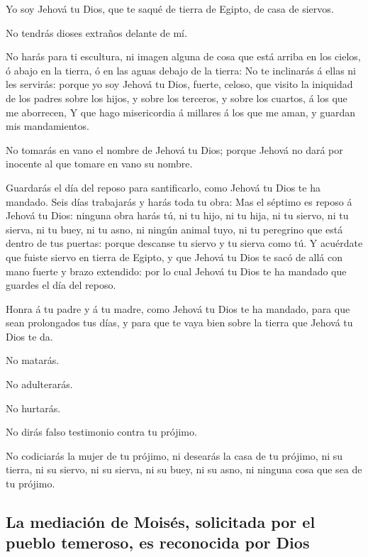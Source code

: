  Yo soy Jehová tu Dios, que te saqué de tierra de Egipto,
de casa de siervos.

 No tendrás dioses extraños delante de mí.

 No harás para ti escultura, ni imagen alguna de cosa que
está arriba en los cielos, ó abajo en la tierra, ó en las aguas debajo
de la tierra:  No te inclinarás á ellas ni les servirás:
porque yo soy Jehová tu Dios, fuerte, celoso, que visito la iniquidad de
los padres sobre los hijos, y sobre los terceros, y sobre los cuartos, á
los que me aborrecen,  Y que hago misericordia á millares
á los que me aman, y guardan mis mandamientos.

 No tomarás en vano el nombre de Jehová tu Dios; porque
Jehová no dará por inocente al que tomare en vano su nombre.

 Guardarás el día del reposo para santificarlo, como
Jehová tu Dios te ha mandado.  Seis días trabajarás y
harás toda tu obra:  Mas el séptimo es reposo á Jehová tu
Dios: ninguna obra harás tú, ni tu hijo, ni tu hija, ni tu siervo, ni tu
sierva, ni tu buey, ni tu asno, ni ningún animal tuyo, ni tu peregrino
que está dentro de tus puertas: porque descanse tu siervo y tu sierva
como tú.  Y acuérdate que fuiste siervo en tierra de
Egipto, y que Jehová tu Dios te sacó de allá con mano fuerte y brazo
extendido: por lo cual Jehová tu Dios te ha mandado que guardes el día
del reposo.

 Honra á tu padre y á tu madre, como Jehová tu Dios te ha
mandado, para que sean prolongados tus días, y para que te vaya bien
sobre la tierra que Jehová tu Dios te da.

 No matarás.

 No adulterarás.

 No hurtarás.

 No dirás falso testimonio contra tu prójimo.

 No codiciarás la mujer de tu prójimo, ni desearás la
casa de tu prójimo, ni su tierra, ni su siervo, ni su sierva, ni su
buey, ni su asno, ni ninguna cosa que sea de tu prójimo.

\hypertarget{la-mediaciuxf3n-de-moisuxe9s-solicitada-por-el-pueblo-temeroso-es-reconocida-por-dios}{%
\subsection{La mediación de Moisés, solicitada por el pueblo temeroso,
es reconocida por
Dios}\label{la-mediaciuxf3n-de-moisuxe9s-solicitada-por-el-pueblo-temeroso-es-reconocida-por-dios}}

